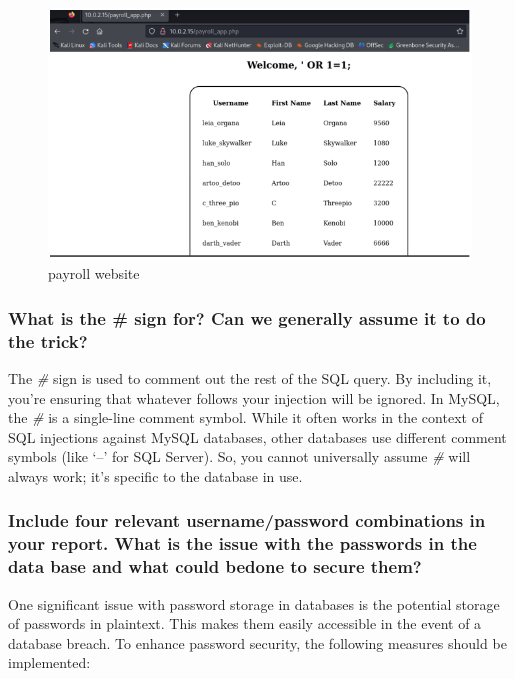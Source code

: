 \begin{figure}[H]
      \centering
      \includegraphics[width=\linewidth]{pic/payroll website.png}
      \caption{payroll website}
      \label{fig:payroll website}
\end{figure}


\subsubsection{What is the \# sign for? Can we generally assume it to do the trick?}
The \textit{\#} sign is used to comment out the rest of the SQL query. By including it, you're
ensuring that whatever follows your injection will be ignored. In MySQL, the \textit{\#} is a
single-line comment symbol. While it often works in the context of SQL injections against
MySQL databases, other databases use different comment symbols (like ‘--’ for SQL
Server). So, you cannot universally assume \textit{\#} will always work; it's specific to the database
in use.


\subsubsection{Include four relevant username/password combinations in your report. What is the issue with the passwords in the data base and what could bedone to secure them?}
One significant issue with password storage in databases is the potential storage of passwords in plaintext.
This makes them easily accessible in the event of a database breach. To enhance password security,
the following measures should be implemented:


